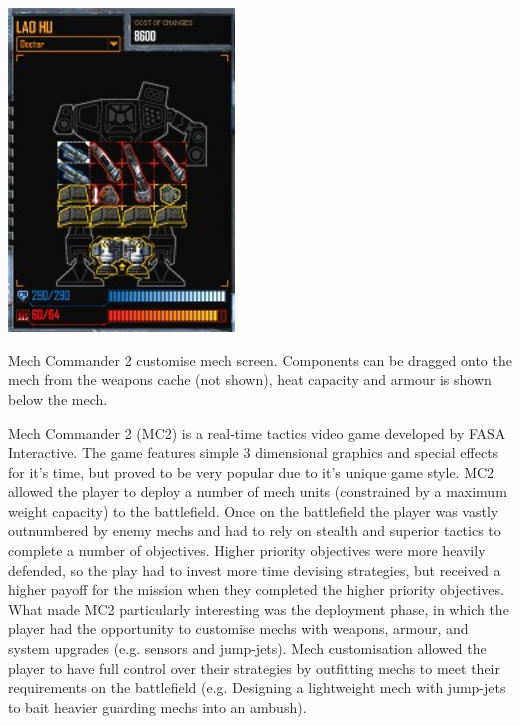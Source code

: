 \begin{marginfigure}
	\includegraphics[width=6cm]{res/mc2/laohu_lab_half}
	\caption{Mech Commander 2 customise mech screen. Components can be dragged onto the mech from the weapons cache (not shown), heat capacity and armour is shown below the mech.}
\end{marginfigure}


Mech Commander 2 (MC2) is a real-time tactics video game developed by FASA Interactive. The game features simple 3 dimensional graphics and special effects for it's time, but proved to be very popular due to it's unique game style. MC2 allowed the player to deploy a number of mech units (constrained by a maximum weight capacity) to the battlefield. Once on the battlefield the player was vastly outnumbered by enemy mechs and had to rely on stealth and superior tactics to complete a number of objectives. Higher priority objectives were more heavily defended, so the play had to invest more time devising strategies, but received a higher payoff for the mission when they completed the higher priority objectives. What made MC2 particularly interesting was the deployment phase, in which the player had the opportunity to customise mechs with weapons, armour, and system upgrades (e.g. sensors and jump-jets). Mech customisation allowed the player to have full control over their strategies by outfitting mechs to meet their requirements on the battlefield (e.g. Designing a lightweight mech with jump-jets to bait heavier guarding mechs into an ambush).



